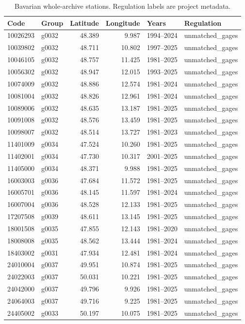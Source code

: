 \begin{table}[p]\centering\footnotesize
\setlength{\tabcolsep}{3pt}
\caption{Bavarian whole-archive stations. Regulation labels are project metadata.}
\label{tab:station-roster-bavaria}
\begin{tabular}{llrrll}
\toprule
Code & Group & Latitude & Longitude & Years & Regulation \\
\midrule
10026293 & g0032 & 48.389 & 9.987 & 1994--2024 & unmatched\_gages \\
10039802 & g0032 & 48.711 & 10.802 & 1997--2025 & unmatched\_gages \\
10046105 & g0032 & 48.757 & 11.425 & 1981--2025 & unmatched\_gages \\
10056302 & g0032 & 48.947 & 12.015 & 1993--2025 & unmatched\_gages \\
10074009 & g0032 & 48.886 & 12.574 & 1981--2024 & unmatched\_gages \\
10081004 & g0032 & 48.826 & 12.961 & 1981--2024 & unmatched\_gages \\
10089006 & g0032 & 48.635 & 13.187 & 1981--2025 & unmatched\_gages \\
10091008 & g0032 & 48.576 & 13.459 & 1981--2025 & unmatched\_gages \\
10098007 & g0032 & 48.514 & 13.727 & 1981--2023 & unmatched\_gages \\
11401009 & g0034 & 47.524 & 10.260 & 1981--2025 & unmatched\_gages \\
11402001 & g0034 & 47.730 & 10.317 & 2001--2025 & unmatched\_gages \\
11405000 & g0034 & 48.371 & 9.988 & 1981--2025 & unmatched\_gages \\
16003003 & g0036 & 47.684 & 11.572 & 1981--2025 & unmatched\_gages \\
16005701 & g0036 & 48.145 & 11.597 & 1981--2024 & unmatched\_gages \\
16007004 & g0036 & 48.528 & 12.133 & 1981--2025 & unmatched\_gages \\
17207508 & g0039 & 48.611 & 13.145 & 1981--2025 & unmatched\_gages \\
18001508 & g0035 & 47.855 & 12.143 & 1981--2020 & unmatched\_gages \\
18008008 & g0035 & 48.562 & 13.444 & 1981--2024 & unmatched\_gages \\
18403002 & g0031 & 47.934 & 12.481 & 1981--2024 & unmatched\_gages \\
24010004 & g0037 & 49.951 & 10.874 & 1981--2025 & unmatched\_gages \\
24022003 & g0037 & 50.031 & 10.221 & 1981--2025 & unmatched\_gages \\
24042000 & g0037 & 49.796 & 9.926 & 1981--2025 & unmatched\_gages \\
24064003 & g0037 & 49.716 & 9.225 & 1981--2025 & unmatched\_gages \\
24405002 & g0033 & 50.197 & 10.075 & 1981--2025 & unmatched\_gages \\
\bottomrule\end{tabular}
\end{table}


